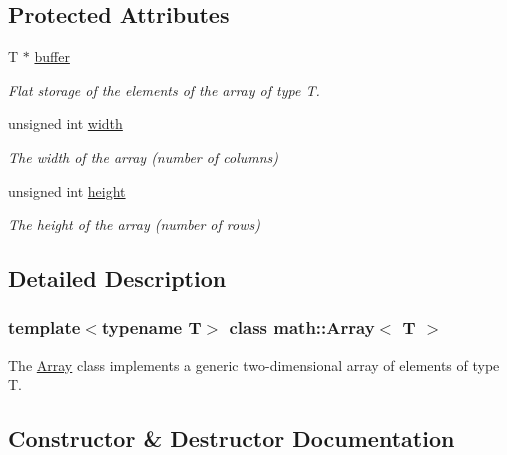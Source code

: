 \subsection*{Protected Attributes}
\begin{DoxyCompactItemize}
\item 
\mbox{\label{classmath_1_1_array_a51c616a2c3aad25866de1a644ccf85d9}} 
T $\ast$ \hyperlink{classmath_1_1_array_a51c616a2c3aad25866de1a644ccf85d9}{buffer}
\begin{DoxyCompactList}\small\item\em Flat storage of the elements of the array of type T. \end{DoxyCompactList}\item 
\mbox{\label{classmath_1_1_array_aac107e42abccdfb484b0544e6a860c10}} 
unsigned int \hyperlink{classmath_1_1_array_aac107e42abccdfb484b0544e6a860c10}{width}
\begin{DoxyCompactList}\small\item\em The width of the array (number of columns) \end{DoxyCompactList}\item 
\mbox{\label{classmath_1_1_array_a80b79625a8f11cbc63843376b591360c}} 
unsigned int \hyperlink{classmath_1_1_array_a80b79625a8f11cbc63843376b591360c}{height}
\begin{DoxyCompactList}\small\item\em The height of the array (number of rows) \end{DoxyCompactList}\end{DoxyCompactItemize}


\subsection{Detailed Description}
\subsubsection*{template$<$typename T$>$\newline
class math\+::\+Array$<$ T $>$}

The \hyperlink{classmath_1_1_array}{Array} class implements a generic two-\/dimensional array of elements of type T. 

\subsection{Constructor \& Destructor Documentation}
\mbox{\label{classmath_1_1_array_abd2edb231282b3b43fcc3c7a91a59ca4}} 
